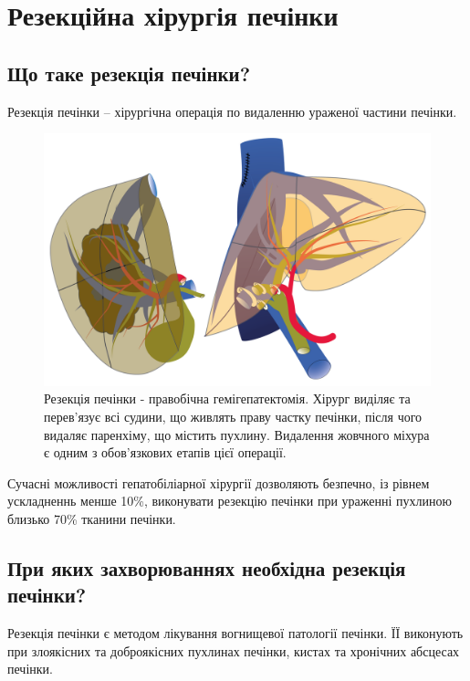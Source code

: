 \chapter{Резекційна хірургія печінки}

\section{Що таке резекція печінки?}

Резекція печінки -- хірургічна операція по видаленню ураженої частини печінки. 

\begin{figure}
  \includegraphics[width=\linewidth]{Figures/Right hepatectomy_Resection.png}
  \caption{Резекція печінки - правобічна гемігепатектомія. Хірург виділяє та перев'язує всі судини, що живлять праву частку печінки, після чого видаляє паренхіму, що містить пухлину. Видалення жовчного міхура є одним з обов'язкових етапів цієї операції.}
  \label{fig:textfig}
\end{figure}

Сучасні можливості гепатобіліарної хірургії дозволяють безпечно, із рівнем ускладненнь менше 10\%, виконувати резекцію печінки при ураженні пухлиною близько 70\% тканини печінки. 


\section{При яких захворюваннях необхідна резекція печінки?}

Резекція печінки є методом лікування вогнищевої патології печінки. ЇЇ виконують при злоякісних та доброякісних пухлинах печінки, кистах та хронічних абсцесах печінки.



